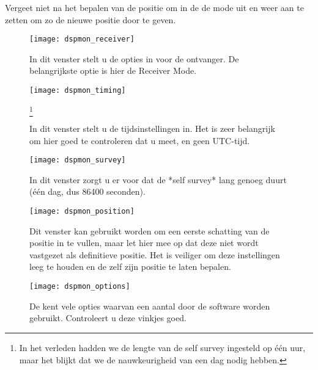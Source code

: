 Vergeet niet na het bepalen van de positie om in de \hisparc \daq de
\daq mode uit en weer aan te zetten om zo de nieuwe positie door te
geven.

\begin{figure}
    \centering
    \texttt{[image: dspmon\_receiver]}
    \caption{In dit venster stelt u de opties in voor de \gps ontvanger. 
    De belangrijkste optie is hier de Receiver Mode.}
    \label{fig:dspmon_receiver}
\end{figure}

\begin{figure}
    \centering
    \texttt{[image: dspmon\_timing]}
    \caption{In dit venster stelt u de tijdsinstellingen in. Het is
    zeer belangrijk om hier goed te controleren dat u \gps meet, en
    geen UTC-tijd.}\footnote{In het verleden hadden we de lengte van de
    self survey ingesteld op één uur, maar het blijkt dat we de
    nauwkeurigheid van een dag nodig hebben.}
    \label{fig:dspmon_timing}
\end{figure}

\begin{figure}
    \centering
    \texttt{[image: dspmon\_survey]}
    \caption{In dit venster zorgt u er voor dat de *self survey* lang
    genoeg duurt (één dag, dus 86400 seconden).}
    \label{fig:dspmon_survey}
\end{figure}
   
\begin{figure}
    \centering
    \texttt{[image: dspmon\_position]}
    \caption{Dit venster kan gebruikt worden om een eerste schatting van
    de positie in te vullen, maar let hier mee op dat deze niet wordt
    vastgezet als definitieve positie. Het is veiliger om deze
    instellingen leeg te houden en de \gps zelf zijn positie te laten
    bepalen.}
    \label{fig:dspmon_position}
\end{figure}

\begin{figure}
    \centering
    \texttt{[image: dspmon\_options]}
    \caption{De \gps kent vele opties waarvan een aantal door de \hisparc
    software worden gebruikt. Controleert u deze vinkjes goed.}
    \label{fig:dspmon_options}
\end{figure}




